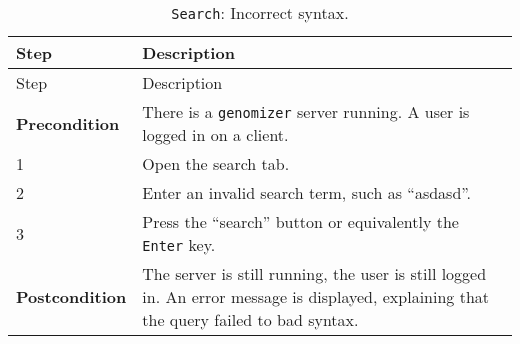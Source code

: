 \begin{longtable}[c]{@{}ll@{}}
\caption{\texttt{Search}: Incorrect syntax.}\tabularnewline
\toprule
\begin{minipage}[b]{0.31\columnwidth}\raggedright\strut
Step
\strut\end{minipage} &
\begin{minipage}[b]{0.63\columnwidth}\raggedright\strut
Description
\strut\end{minipage}\tabularnewline
\midrule
\endfirsthead
\toprule
\begin{minipage}[b]{0.31\columnwidth}\raggedright\strut
Step
\strut\end{minipage} &
\begin{minipage}[b]{0.63\columnwidth}\raggedright\strut
Description
\strut\end{minipage}\tabularnewline
\midrule
\endhead
\begin{minipage}[t]{0.31\columnwidth}\raggedright\strut
\textbf{Precondition}
\strut\end{minipage} &
\begin{minipage}[t]{0.63\columnwidth}\raggedright\strut
There is a \texttt{genomizer} server running. A user is logged in on a
client.
\strut\end{minipage}\tabularnewline
\begin{minipage}[t]{0.31\columnwidth}\raggedright\strut
1
\strut\end{minipage} &
\begin{minipage}[t]{0.63\columnwidth}\raggedright\strut
Open the search tab.
\strut\end{minipage}\tabularnewline
\begin{minipage}[t]{0.31\columnwidth}\raggedright\strut
2
\strut\end{minipage} &
\begin{minipage}[t]{0.63\columnwidth}\raggedright\strut
Enter an invalid search term, such as ``asdasd''.
\strut\end{minipage}\tabularnewline
\begin{minipage}[t]{0.31\columnwidth}\raggedright\strut
3
\strut\end{minipage} &
\begin{minipage}[t]{0.63\columnwidth}\raggedright\strut
Press the ``search'' button or equivalently the \texttt{Enter} key.
\strut\end{minipage}\tabularnewline
\begin{minipage}[t]{0.31\columnwidth}\raggedright\strut
\textbf{Postcondition}
\strut\end{minipage} &
\begin{minipage}[t]{0.63\columnwidth}\raggedright\strut
The server is still running, the user is still logged in. An error
message is displayed, explaining that the query failed to bad syntax.
\strut\end{minipage}\tabularnewline
\bottomrule
\end{longtable}

